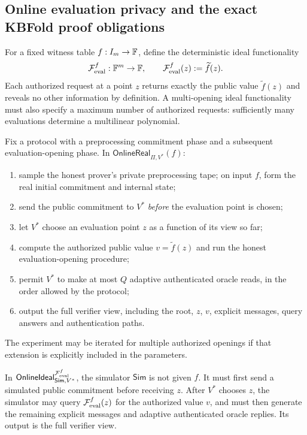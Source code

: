 \subsection{Online evaluation privacy and the exact KBFold proof obligations}\label{sec:security:online}

\begin{definition}\label{def:security:ideal-eval}
For a fixed witness table $f:I_m\to\mathbb{F}$, define the deterministic ideal functionality
\[
  \mathcal F_{\rm eval}^f:\mathbb{F}^m\to\mathbb{F},\qquad
  \mathcal F_{\rm eval}^f(z):=\widetilde f(z).
\]
Each authorized request at a point $z$ returns exactly the public value $\widetilde f(z)$ and reveals no other information by definition. A multi-opening ideal functionality must also specify a maximum number of authorized requests: sufficiently many evaluations determine a multilinear polynomial.
\end{definition}

\begin{definition}\label{def:security:online-real}
Fix a protocol with a preprocessing commitment phase and a subsequent evaluation-opening phase. In
$\mathsf{OnlineReal}_{\Pi,V^*}(f)$:
\begin{enumerate}[label=\textup{(\roman*)}]
\item sample the honest prover's private preprocessing tape; on input $f$, form the real initial commitment and internal state;
\item send the public commitment to $V^*$ \emph{before} the evaluation point is chosen;
\item let $V^*$ choose an evaluation point $z$ as a function of its view so far;
\item compute the authorized public value $v=\widetilde f(z)$ and run the honest evaluation-opening procedure;
\item permit $V^*$ to make at most $Q$ adaptive authenticated oracle reads, in the order allowed by the protocol;
\item output the full verifier view, including the root, $z$, $v$, explicit messages, query answers and authentication paths.
\end{enumerate}
The experiment may be iterated for multiple authorized openings if that extension is explicitly included in the parameters.
\end{definition}

\begin{definition}\label{def:security:online-ideal}
In $\mathsf{OnlineIdeal}_{\mathsf{Sim},V^*}^{\mathcal F_{\rm eval}^f}$, the simulator $\mathsf{Sim}$ is not given $f$. It must first send a simulated public commitment before receiving $z$. After $V^*$ chooses $z$, the simulator may query $\mathcal F_{\rm eval}^f(z)$ for the authorized value $v$, and must then generate the remaining explicit messages and adaptive authenticated oracle replies. Its output is the full verifier view.
\end{definition}

